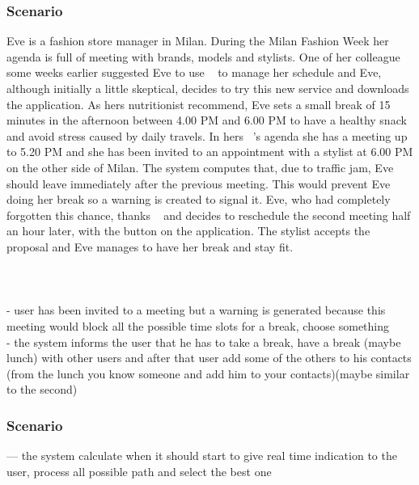 \subsubsection{Scenario \thecountScenarios }
Eve is a fashion store manager in Milan. During the Milan Fashion Week her agenda is full of meeting with brands, models and stylists. One of her colleague some weeks earlier suggested Eve to use \projectname~ to manage her schedule and Eve, although initially a little skeptical, decides to try this new service and downloads the application. As hers nutritionist recommend, Eve sets a small break of 15 minutes in the afternoon between 4.00 PM and 6.00 PM to have a healthy snack and avoid stress caused by daily travels. In hers \projectname~'s agenda she has a meeting up to 5.20 PM and she has been invited to an appointment with a stylist at 6.00 PM on the other side of Milan. The system computes that, due to traffic jam, Eve should leave immediately after the previous meeting. This would prevent Eve doing her break so a warning is created to signal it. Eve, who had completely forgotten this chance, thanks \projectname~ and decides to reschedule the second meeting half an hour later, with the button on the application. The stylist accepts the proposal and Eve manages to have her break and stay fit.
\\
\\
\\
\\
- user has been invited to a meeting but a warning is generated because this meeting would block all the possible time slots for a break, choose something\\
- the system informs the user that he has to take a break, have a break (maybe lunch) with other users and after that user add some of the others to his contacts (from the lunch you know someone and add him to your contacts)(maybe similar to the second)\\


\subsubsection{Scenario \thecountScenarios }
--- the system calculate when it should start to give real time indication to the user, process all possible path and select the best one\\

